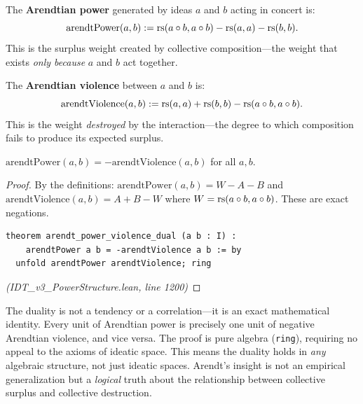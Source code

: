 \begin{definition}
\label{def:arendt-power}
The \textbf{Arendtian power} generated by ideas $a$ and $b$ acting in concert is:
\[
  \mathrm{arendtPower}(a, b) := \mathrm{rs}(a \circ b, a \circ b) - \mathrm{rs}(a,a) - \mathrm{rs}(b,b).
\]
This is the surplus weight created by collective composition---the weight that
exists \emph{only because} $a$ and $b$ act together.
\end{definition}

\begin{definition}
\label{def:arendt-violence}
The \textbf{Arendtian violence} between $a$ and $b$ is:
\[
  \mathrm{arendtViolence}(a, b) := \mathrm{rs}(a,a) + \mathrm{rs}(b,b) - \mathrm{rs}(a \circ b, a \circ b).
\]
This is the weight \emph{destroyed} by the interaction---the degree to which
composition fails to produce its expected surplus.
\end{definition}

\begin{theorem}
\label{thm:arendt-duality}
$\mathrm{arendtPower}(a, b) = -\mathrm{arendtViolence}(a, b)$ for all $a, b$.
\end{theorem}

\begin{proof}
By the definitions: $\mathrm{arendtPower}(a,b) = W - A - B$ and
$\mathrm{arendtViolence}(a,b) = A + B - W$ where $W = \mathrm{rs}(a \circ b, a \circ b)$.
These are exact negations.
\begin{lstlisting}
theorem arendt_power_violence_dual (a b : I) :
    arendtPower a b = -arendtViolence a b := by
  unfold arendtPower arendtViolence; ring
\end{lstlisting}
\textit{(IDT\_v3\_PowerStructure.lean, line 1200)}
\end{proof}

\begin{remark}
The duality is not a tendency or a correlation---it is an exact mathematical
identity. Every unit of Arendtian power is precisely one unit of negative
Arendtian violence, and vice versa. The proof is pure algebra (\texttt{ring}),
requiring no appeal to the axioms of ideatic space. This means the duality
holds in \emph{any} algebraic structure, not just ideatic spaces. Arendt's
insight is not an empirical generalization but a \emph{logical} truth about
the relationship between collective surplus and collective destruction.
\end{remark}

